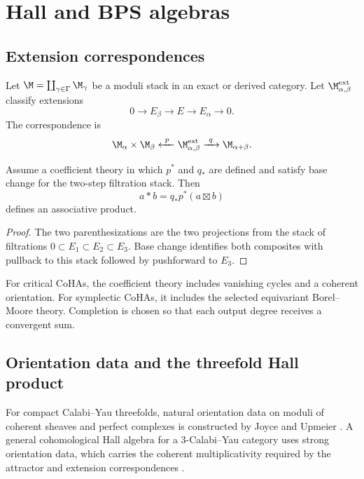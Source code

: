 \part{Hall and BPS algebras}

\chapter{Extension correspondences}
Let $\M=\coprod_{\gamma\in\Gamma}\M_\gamma$ be a moduli stack in an exact or derived category. Let $\M^{\mathrm{ext}}_{\alpha,\beta}$ classify extensions
\[
 0\longrightarrow E_\beta\longrightarrow E\longrightarrow E_\alpha\longrightarrow0.
\]
The correspondence is
\[
 \M_\alpha\times\M_\beta
 \xleftarrow{\ p\ }
 \M^{\mathrm{ext}}_{\alpha,\beta}
 \xrightarrow{\ q\ }
 \M_{\alpha+\beta}.
\]

\begin{theorem}
Assume a coefficient theory in which $p^*$ and $q_*$ are defined and satisfy base change for the two-step filtration stack. Then
\[
 a*b=q_*p^*(a\boxtimes b)
\]
defines an associative product.
\end{theorem}
\begin{proof}
The two parenthesizations are the two projections from the stack of filtrations $0\subset E_1\subset E_2\subset E_3$. Base change identifies both composites with pullback to this stack followed by pushforward to $E_3$.
\end{proof}

For critical CoHAs, the coefficient theory includes vanishing cycles and a coherent orientation. For symplectic CoHAs, it includes the selected equivariant Borel--Moore theory. Completion is chosen so that each output degree receives a convergent sum.

\chapter{Orientation data and the threefold Hall product}
For compact Calabi--Yau threefolds, natural orientation data on moduli of coherent sheaves and perfect complexes is constructed by Joyce and Upmeier \cite{JoyceUpmeier}.  A general cohomological Hall algebra for a $3$-Calabi--Yau category uses strong orientation data, which carries the coherent multiplicativity required by the attractor and extension correspondences \cite{KPS}.

